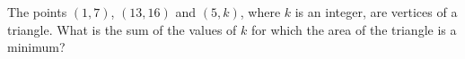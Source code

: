 The points $(1,7)$, $(13,16)$ and $(5,k)$, where $k$ is an integer, are vertices of a triangle. What is the sum of the values of $k$ for which the area of the triangle is a minimum?
